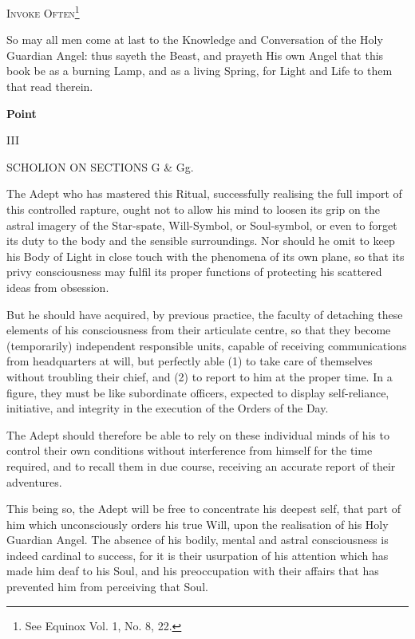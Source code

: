 {
\centering
\Large
\textsc{Invoke Often}\footnote{See Equinox Vol. 1, No. 8, 22.\footnotemark}
\par
}


So may all men come at last to the Knowledge and Conversation of the Holy Guardian Angel: thus sayeth the Beast, and prayeth His own Angel that this book be as a burning Lamp, and as a living Spring, for Light and Life to them that read therein.


{
\par
}

\pagebreak

{\centering
\textbf{Point}

III

SCHOLION ON SECTIONS G \& Gg.
\par}


The Adept who has mastered this Ritual, successfully realising the full import of this controlled rapture, ought not to allow his mind to loosen its grip on the astral imagery of the Star-spate, Will-Symbol, or Soul-symbol, or even to forget its duty to the body and the sensible surroundings. Nor should he omit to keep his Body of Light in close touch with the phenomena of its own plane, so that its privy consciousness may fulfil its proper functions of protecting his scattered ideas from obsession.

But he should have acquired, by previous practice, the faculty of detaching these elements of his consciousness from their articulate centre, so that they become (temporarily) independent responsible units, capable of receiving communications from headquarters at will, but perfectly able (1) to take care of themselves without troubling their chief, and (2) to report to him at the proper time. In a figure, they must be like subordinate officers, expected to display self-reliance, initiative, and integrity in the execution of the Orders of the Day.

The Adept should therefore be able to rely on these individual minds of his to control their own conditions without interference from himself for the time required, and to recall them in due course, receiving an accurate report of their adventures.

This being so, the Adept will be free to concentrate his deepest self, that part of him which unconsciously orders his true Will, upon the realisation of his Holy Guardian Angel. The absence of his bodily, mental and astral consciousness is indeed cardinal to success, for it is their usurpation of his attention which has made him deaf to his Soul, and his preoccupation with their affairs that has prevented him from perceiving that Soul.

